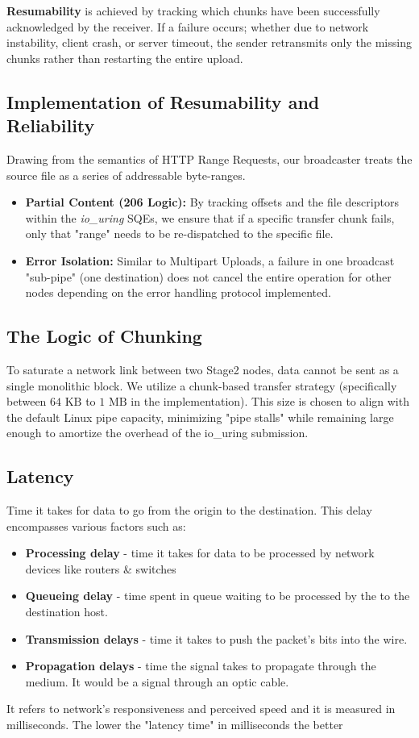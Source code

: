 \documentclass[
	a4paper,
	10pt,
	unnumberedsections,
	twoside, 
]{LTJournalArticle}
\begin{document}
\textbf{Resumability} is achieved by tracking which chunks have been successfully acknowledged by the receiver.  
If a failure occurs; whether due to network instability, client crash, or server timeout, the sender retransmits only the missing chunks rather than restarting the entire upload.

\subsection{Implementation of Resumability and Reliability}
Drawing from the semantics of HTTP Range Requests, our broadcaster treats the source file as a series of addressable byte-ranges.

\begin{itemize}
	\item \textbf{Partial Content (206 Logic):} By tracking offsets and the file descriptors within the \textit{io\_uring} SQEs, we ensure that if a specific transfer chunk fails, only that "range" needs to be re-dispatched to the specific file.
	\item \textbf{Error Isolation:} Similar to Multipart Uploads, a failure in one broadcast "sub-pipe" (one destination) does not cancel the entire operation for other nodes depending on the error handling protocol implemented.
\end{itemize}

\subsection{The Logic of Chunking}
\label{sec:chunking}
To saturate a network link between two Stage2 nodes, data cannot be sent as a single monolithic block. We utilize a chunk-based transfer strategy (specifically between $64\text{ KB}$ to $1\text{ MB}$ in the implementation). This size is chosen to align with the default Linux pipe capacity, minimizing "pipe stalls" while remaining large enough to amortize the overhead of the io\_uring submission.


\subsection{Latency}
\label{sec:latency}
Time it takes for data to go from the origin to the destination. This delay encompasses various factors such as:
\begin{itemize}
	\item \textbf{Processing delay} - time it takes for data to be processed by network devices like routers \& switches
	\item \textbf{Queueing delay} - time spent in queue waiting to be processed by the to the destination host.
	\item \textbf{Transmission delays} - time it takes to push the packet’s bits into the wire.
	\item \textbf{Propagation delays} - time the signal takes to propagate through the medium. It would be a signal through an optic cable.
\end{itemize}
It refers to network’s responsiveness and perceived speed and it is measured in milliseconds. The lower the "latency time" in milliseconds the better
\end{document}
